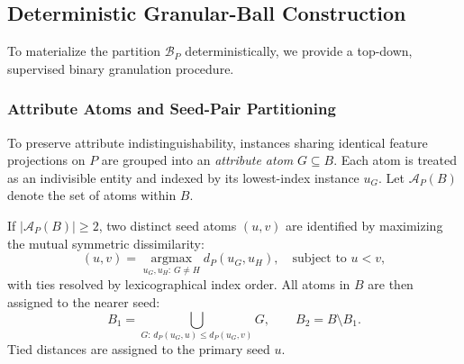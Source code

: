 \subsection{Deterministic Granular-Ball Construction}
\label{subsec:granulation-rule}
To materialize the partition $\mathcal{B}_P$ deterministically, we provide a top-down, supervised binary granulation procedure. 

\subsubsection{Attribute Atoms and Seed-Pair Partitioning}
To preserve attribute indistinguishability, instances sharing identical feature projections on $P$ are grouped into an \emph{attribute atom} $G \subseteq B$. Each atom is treated as an indivisible entity and indexed by its lowest-index instance $u_G$. Let $\mathcal{A}_P(B)$ denote the set of atoms within $B$. 

If $|\mathcal{A}_P(B)| \ge 2$, two distinct seed atoms $(u, v)$ are identified by maximizing the mutual symmetric dissimilarity:
\begin{equation}
	(u, v) = \underset{u_G, u_H:\, G \ne H}{\operatorname{argmax}} d_P(u_G, u_H), \quad \text{subject to } u < v,
	\label{eq:granular-seeds}
\end{equation}
with ties resolved by lexicographical index order. All atoms in $B$ are then assigned to the nearer seed:
\begin{equation}
	B_1 = \bigcup_{G:\, d_P(u_G, u) \le d_P(u_G, v)} G, \qquad B_2 = B \setminus B_1.
	\label{eq:atom-assignment}
\end{equation}
Tied distances are assigned to the primary seed $u$.

